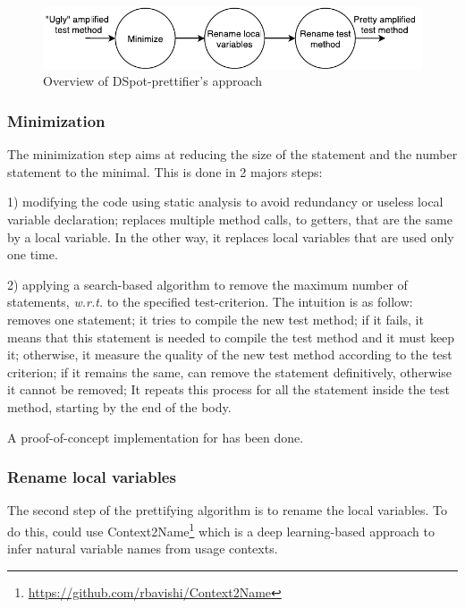 \begin{figure}
	\label{fig:dspot-prettifier-overview}
	\caption{Overview of DSpot-prettifier's approach}
	\includegraphics[width=.9\linewidth]{approach.pdf}
\end{figure}

\subsubsection{Minimization}
\label{subsubsec:conclusion:short-prespectives:prettifier:miminize}
The minimization step aims at reducing the size of the statement and the number statement to the minimal.
This is done in 2 majors steps:

1) modifying the code using static analysis to avoid redundancy or useless local variable declaration;
\dspotprettifier replaces multiple method calls, \eg to getters, that are the same by a local variable.
In the other way, it replaces local variables that are used only one time.

2) applying a search-based algorithm to remove the maximum number of statements, \emph{w.r.t.} to the specified test-criterion.
The intuition is as follow:
\dspotprettifier removes one statement;
it tries to compile the new test method;
if it fails, it means that this statement is needed to compile the test method and it must keep it;
otherwise, it measure the quality of the new test method according to the test criterion;
if it remains the same, \dspotprettifier can remove the statement definitively, otherwise it cannot be removed;
It repeats this process for all the statement inside the test method, starting by the end of the body.

A proof-of-concept implementation for \ms has been done.

\subsubsection{Rename local variables}
\label{subsubsec:conclusion:short-prespectives:prettifier:rename-local}

The second step of the prettifying algorithm is to rename the local variables.
To do this, \dspotprettifier could use Context2Name\footnote{\url{https://github.com/rbavishi/Context2Name}}\cite{DBLP:journals/corr/abs-1809-05193} which is a deep learning-based approach to infer natural variable names from usage contexts.

